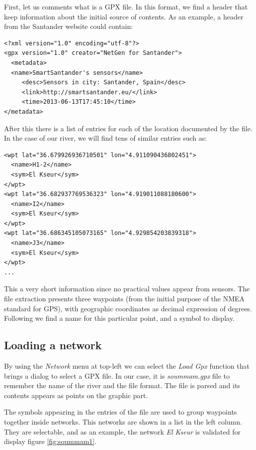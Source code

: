 First, let us comments what is a GPX file. In this format, we find a header 
that keep information about the initial source of contents. As an example, 
a header from the Santander website could contain: 

\begin{lstlisting}
<?xml version="1.0" encoding="utf-8"?>
<gpx version="1.0" creator="NetGen for Santander">
  <metadata>
  <name>SmartSantander's sensors</name>
     <desc>Sensors in city: Santander, Spain</desc>
     <link>http://smartsantander.eu/</link>
     <time>2013-06-13T17:45:10</time>
</metadata>
\end{lstlisting}

After this there is a list of entries for each of the location documented by the file. 
In the case of our river, we will find tens of similar entries such as: 

\begin{lstlisting}
<wpt lat="36.679926936710501" lon="4.911090436802451">
  <name>H1-2</name>
  <sym>El Kseur</sym>
</wpt>
<wpt lat="36.682937769536323" lon="4.919011088180600">
  <name>I2</name>
  <sym>El Kseur</sym>
</wpt>
<wpt lat="36.686345105073165" lon="4.929854203839318">
  <name>J3</name>
  <sym>El Kseur</sym>
</wpt>
...
\end{lstlisting}

This a very short information since no practical values appear from sensors. 
The file extraction presents three waypoints (from the initial purpose of the NMEA standard for
GPS), with geographic coordinates as decimal expression of degrees. 
Following we find a name for this particular point, and a symbol to display. 

\subsection{Loading a network}

By using the \emph{Network} menu at top-left we can select the 
\emph{Load Gpx} function that brings a dialog 
to select a GPX file. In our case, it is \emph{soummam.gpx} 
file to remember the name of the river and the file format. 
The file is parsed and its contents appears as points on the graphic part.

The symbols appearing in the entries of the file are used to group waypoints together 
inside networks. This networks are shown in a list in the left column. 
They are selectable, and as an example, the network \emph{El Kseur} is validated 
for display figure \ref{fig:soummam1}. 

